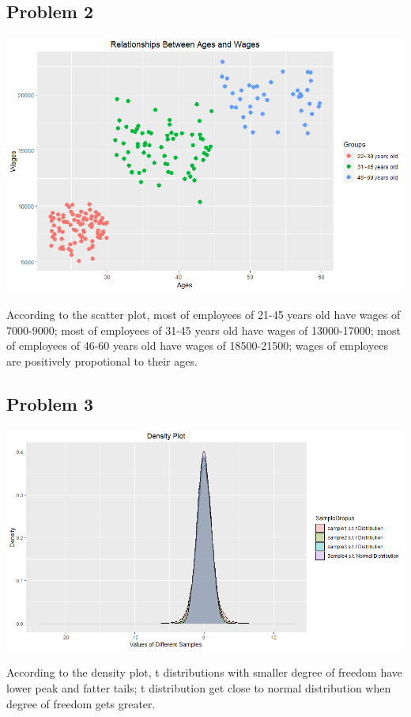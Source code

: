 \documentclass[12pt]{article}
\begin{document}
\subsection*{Problem 2}

\begin{center}
	\includegraphics[width=1.2\textwidth]{Relationships.png}
\end{center}
According to the scatter plot, most of employees of 21-45 years old have wages of 7000-9000; most of employees of 31-45 years old have wages of 13000-17000; most of employees of 46-60 years old have wages of 18500-21500; wages of employees are positively propotional to their ages.
\subsection*{Problem 3}

\begin{center}
	\includegraphics[width=1.2\textwidth]{Density.png}
\end{center}
According to the density plot, t distributions with smaller degree of freedom have lower peak and fatter tails; t distribution get close to normal distribution when degree of freedom gets greater.
\end{document}
